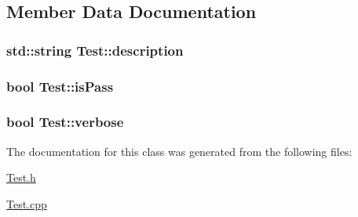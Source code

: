 \subsection{Member Data Documentation}
\hypertarget{classTest_a9452136cd882a23b8e52f5b2a82a5bb3}{
\subsubsection[{description}]{\setlength{\rightskip}{0pt plus 5cm}std\-::string Test\-::description\hspace{0.3cm}{\ttfamily [private]}}}\label{classTest_a9452136cd882a23b8e52f5b2a82a5bb3}
\hypertarget{classTest_a91d1d78671cfc2b974b6ae3c8a88f25d}{
\subsubsection[{is\-Pass}]{\setlength{\rightskip}{0pt plus 5cm}bool Test\-::is\-Pass\hspace{0.3cm}{\ttfamily [private]}}}\label{classTest_a91d1d78671cfc2b974b6ae3c8a88f25d}
\hypertarget{classTest_ab02c0c474b2a636c948baf761df0b3c5}{
\subsubsection[{verbose}]{\setlength{\rightskip}{0pt plus 5cm}bool Test\-::verbose\hspace{0.3cm}{\ttfamily [private]}}}\label{classTest_ab02c0c474b2a636c948baf761df0b3c5}


The documentation for this class was generated from the following files\-:\begin{DoxyCompactItemize}
\item 
\hyperlink{Test_8h}{Test.\-h}\item 
\hyperlink{Test_8cpp}{Test.\-cpp}\end{DoxyCompactItemize}
